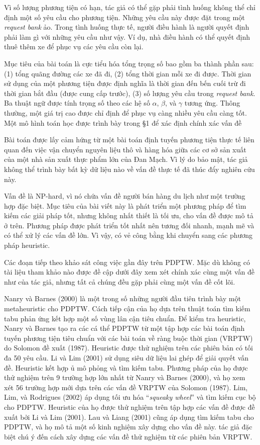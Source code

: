 Vì số lượng phương tiện có hạn, tác giả có thể gặp phải tình huống không thể chỉ định một số yêu cầu cho phương tiện. Những yêu cầu này được đặt trong một \textit{request bank} ảo. Trong tình huống thực tế, người điều hành là người quyết định phải làm gì với những yêu cầu như vậy. Ví dụ, nhà điều hành có thể quyết định thuê thêm xe để phục vụ các yêu cầu còn lại.

Mục tiêu của bài toán là cực tiểu hóa tổng trọng số bao gồm ba thành phần sau: (1) tổng quãng đường các xe đã đi, (2) tổng thời gian mỗi xe đi được. Thời gian sử dụng của một phương tiện được định nghĩa là thời gian đến bến cuối trừ đi thời gian bắt đầu (được cung cấp trước), (3) số lượng yêu cầu trong \textit{request bank}.
Ba thuật ngữ được tính trọng số theo các hệ số $\alpha$, $\beta$, và $\gamma$ tương ứng. Thông thường, một giá trị cao được chỉ định để phục vụ càng nhiều yêu cầu càng tốt. Một mô hình toán học được trình bày trong §1 để xác định chính xác vấn đề

Bài toán được lấy cảm hứng từ một bài toán định tuyến phương tiện thực tế liên quan đến việc vận chuyển nguyên liệu thô và hàng hóa giữa các cơ sở sản xuất của một nhà sản xuất thực phẩm lớn của Đan Mạch. Vì lý do bảo mật, tác giả không thể trình bày bất kỳ dữ liệu nào về vấn đề thực tế đã thúc đẩy nghiên cứu này.

Vấn đề là NP-hard, vì nó chứa vấn đề người bán hàng du lịch như một trường hợp đặc biệt. Mục tiêu của bài viết này là phát triển một phương pháp để tìm kiếm các giải pháp tốt, nhưng không nhất thiết là tối ưu, cho vấn đề được mô tả ở trên. Phương pháp được phát triển tốt nhất nên tương đối nhanh, mạnh mẽ và có thể xử lý các vấn đề lớn. Vì vậy, có vẻ công bằng khi chuyển sang các phương pháp heuristic.

Các đoạn tiếp theo khảo sát công việc gần đây trên PDPTW. Mặc dù không có tài liệu tham khảo nào được đề cập dưới đây xem xét chính xác cùng một vấn đề như của tác giả, nhưng tất cả chúng đều gặp phải cùng một vấn đề cốt lõi.

Nanry và Barnes (2000) là một trong số những người đầu tiên trình bày một metaheuristic cho PDPTW. Cách tiếp cận của họ dựa trên thuật toán tìm kiếm tabu phản ứng kết hợp một số vùng lân cận tiêu chuẩn. Để kiểm tra heuristic, Nanry và Barnes tạo ra các cá thể PDPTW từ một tập hợp các bài toán định tuyến phương tiện tiêu chuẩn với các bài toán về ràng buộc thời gian (VRPTW) do Solomon đề xuất (1987). Heuristic được thử nghiệm trên các phiên bản có tối đa 50 yêu cầu. Li và Lim (2001) sử dụng siêu dữ liệu lai ghép để giải quyết vấn đề. Heuristic kết hợp ủ mô phỏng và tìm kiếm tabu. Phương pháp của họ được thử nghiệm trên 9 trường hợp lớn nhất từ Nanry và Barnes (2000), và họ xem xét 56 trường hợp mới dựa trên các vấn đề VRPTW của Solomon (1987).
Lim, Lim, và Rodrigues (2002) áp dụng tối ưu hóa “\textit{squeaky wheel}” và tìm kiếm cục bộ cho PDPTW. Heuristic của họ được thử nghiệm trên tập hợp các vấn đề được đề xuất bởi Li và Lim (2001). Lau và Liang (2001) cũng áp dụng tìm kiếm tabu cho PDPTW, và họ mô tả một số kinh nghiệm xây dựng cho vấn đề này. tác giả đặc biệt chú ý đến cách xây dựng các vấn đề thử nghiệm từ các phiên bản VRPTW.

